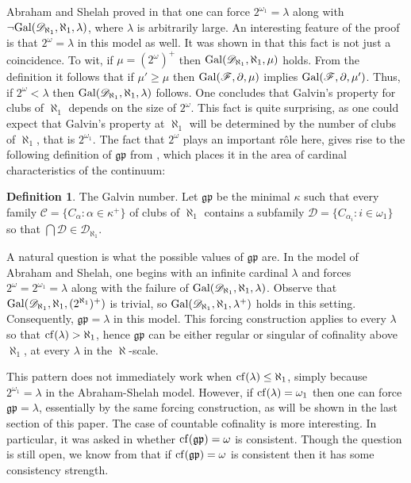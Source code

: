 \documentclass[11pt]{amsart}
\theoremstyle{definition}
\newtheorem{definition}[theorem]{Definition}
\theoremstyle{remark}
\newcommand{\cf}{{\rm cf}}
\begin{document}
Abraham and Shelah proved in \cite{MR830084} that one can force $2^{\omega_1}=\lambda$ along with $\neg{\rm Gal}(\mathscr{D}_{\aleph_1},\aleph_1,\lambda)$, where $\lambda$ is arbitrarily large.
An interesting feature of the proof is that $2^\omega=\lambda$ in this model as well.
It was shown in \cite{MR3604115} that this fact is not just a coincidence.
To wit, if $\mu=(2^\omega)^+$ then ${\rm Gal}(\mathscr{D}_{\aleph_1},\aleph_1,\mu)$ holds.
From the definition it follows that if $\mu'\geq\mu$ then ${\rm Gal}(\mathscr{F},\partial,\mu)$ implies ${\rm Gal}(\mathscr{F},\partial,\mu')$.
Thus, if $2^\omega<\lambda$ then ${\rm Gal}(\mathscr{D}_{\aleph_1},\aleph_1,\lambda)$ follows.
One concludes that Galvin's property for clubs of $\aleph_1$ depends on the size of $2^\omega$.
This fact is quite surprising, as one could expect that Galvin's property at $\aleph_1$ will be determined by the number of clubs of $\aleph_1$, that is $2^{\omega_1}$.
The fact that $2^\omega$ plays an important r\^ole here, gives rise to the following definition of $\mathfrak{gp}$ from \cite{MR3787522}, which places it in the area of cardinal characteristics of the continuum:

\begin{definition}
\label{defgp} The Galvin number. \newline
Let $\mathfrak{gp}$ be the minimal $\kappa$ such that every family $\mathcal{C}=\{C_\alpha:\alpha\in\kappa^+\}$ of clubs of $\aleph_1$ contains a subfamily $\mathcal{D}=\{C_{\alpha_i}:i\in\omega_1\}$ so that $\bigcap\mathcal{D}\in\mathscr{D}_{\aleph_1}$.
\end{definition}

A natural question is what the possible values of $\mathfrak{gp}$ are.
In the model of Abraham and Shelah, one begins with an infinite cardinal $\lambda$ and forces $2^\omega=2^{\omega_1}=\lambda$ along with the failure of ${\rm Gal}(\mathscr{D}_{\aleph_1},\aleph_1,\lambda)$.
Observe that ${\rm Gal}(\mathscr{D}_{\aleph_1},\aleph_1,(2^{\aleph_1})^+)$ is trivial, so ${\rm Gal}(\mathscr{D}_{\aleph_1},\aleph_1,\lambda^+)$ holds in this setting.
Consequently, $\mathfrak{gp}=\lambda$ in this model.
This forcing construction applies to every $\lambda$ so that $\cf(\lambda)>\aleph_1$, hence $\mathfrak{gp}$ can be either regular or singular of cofinality above $\aleph_1$, at every $\lambda$ in the $\aleph$-scale.

This pattern does not immediately work when $\cf(\lambda)\leq\aleph_1$, simply because $2^{\omega_1}=\lambda$ in the Abraham-Shelah model.
However, if $\cf(\lambda)=\omega_1$ then one can force $\mathfrak{gp}=\lambda$, essentially by the same forcing construction, as will be shown in the last section of this paper.
The case of countable cofinality is more interesting.
In particular, it was asked in \cite[Question 4.4]{MR3787522} whether $\cf(\mathfrak{gp})=\omega$ is consistent.
Though the question is still open, we know from \cite{MR4423479} that if $\cf(\mathfrak{gp})=\omega$ is consistent then it has some consistency strength.
\end{document}
